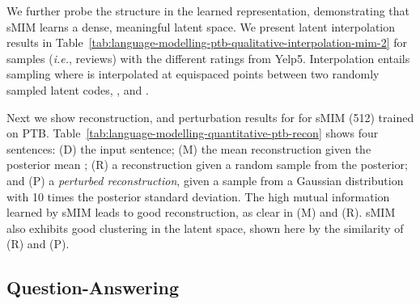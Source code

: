 \documentclass{article}
\newcommand{\ie}{{\em i.e.}}
\begin{document}
We further probe the structure in the learned representation, demonstrating that
sMIM learns a dense, meaningful latent space. We present latent interpolation results in
Table\ \ref{tab:language-modelling-ptb-qualitative-interpolation-mim-2}
for samples (\ie, reviews) with the different ratings from Yelp5. 
Interpolation entails sampling  where  is interpolated at equispaced points  
between two randomly sampled latent codes, , and .

Next we show reconstruction, and perturbation
results for for sMIM (512) trained on PTB. 
Table\ \ref{tab:language-modelling-quantitative-ptb-recon} shows four sentences:
(D) the input sentence;
(M) the mean reconstruction given the posterior mean ;
(R) a reconstruction given a random sample  from the posterior;
and 
(P) a {\em perturbed reconstruction}, given a sample  from a Gaussian
distribution with 10 times the posterior standard deviation.
The high mutual information learned by sMIM leads to good reconstruction, as clear in (M) and (R).
sMIM also exhibits good clustering in the latent space, shown here by the similarity of (R) and (P).


\subsection{Question-Answering} 
\label{sec:nlp-question-answering-yahoo}
\end{document}
